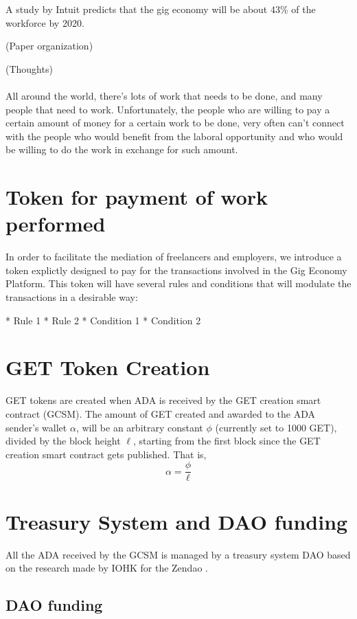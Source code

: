 \documentclass{article}
\begin{document}
A study by Intuit predicts that the gig economy will be about 43\% of the workforce by 2020.

(Paper organization)

(Thoughts)
\paragraph{} All around the world, there's lots of work that needs to be done, and many people that need to work. Unfortunately, the people who are willing to pay a certain amount of money for a certain work to be done, very often can't connect with the people who would benefit from the laboral opportunity and who would be willing to do the work in exchange for such amount.

\section{Token for payment of work performed}
In order to facilitate the mediation of freelancers and employers, we introduce a token explictly designed to pay for the transactions involved in the Gig Economy Platform. This token will have several rules and conditions that will modulate the transactions in a desirable way:

* Rule 1
* Rule 2
* Condition 1
* Condition 2

\section{GET Token Creation}
GET tokens are created when ADA is received by the GET creation smart contract (GCSM).
The amount of GET created and awarded to the ADA sender's wallet $\alpha$, will be an arbitrary constant $\phi$ (currently set to 1000 GET), divided by the block height $\ell$, starting from the first block since the GET creation smart contract gets published. That is,
\[ \alpha
  = \dfrac{\phi}{\ell}
\]

\section{Treasury System and DAO funding}
All the ADA received by the GCSM is managed by a treasury system DAO based on the research made by IOHK for the Zendao \cite{zhangb2}.
 
\subsection{DAO funding}
\end{document}
